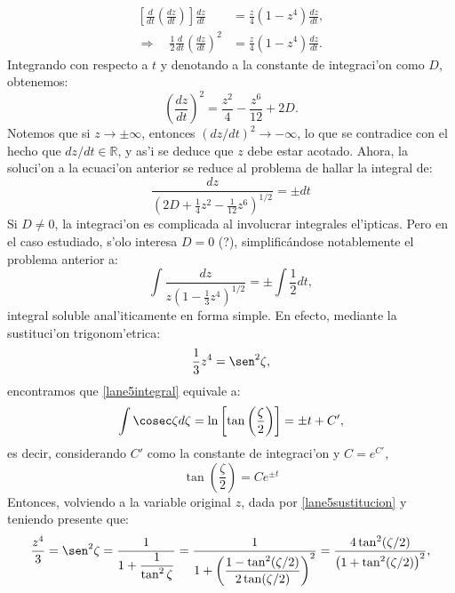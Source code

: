 \begin{align}
\left[\frac{d}{dt}\left(\frac{dz}{dt}\right)\right]\frac{dz}{dt}&=\frac{z}{4}(1-z^4)\frac{dz}{dt},\\
\Rightarrow\quad \frac{1}{2}\frac{d}{dt}\left(\frac{dz}{dt}\right)^2&=\frac{z}{4}(1-z^4)\frac{dz}{dt}.
\end{align}
Integrando con respecto a $t$ y denotando a la constante de integraci'on como $D$, obtenemos:
\begin{equation}
\left(\frac{dz}{dt}\right)^2=\frac{z^2}{4}-\frac{z^6}{12}+2D.
\end{equation}
Notemos que si $z\to\pm\infty$, entonces $(dz/dt)^2\to-\infty$, lo que se contradice con el hecho que $dz/dt\in \mathbb{R}$, y as'i se deduce que $z$ debe estar acotado. Ahora, la soluci'on a la ecuaci'on anterior se reduce al problema de hallar la integral de:
\begin{equation}
 \frac{dz}{\left(2D+\frac{1}{4}z^2-\frac{1}{12}z^6\right)^{1/2}}=\pm dt
\end{equation}
Si $D\neq0$, la integraci'on es complicada al involucrar integrales el'ipticas. Pero en el caso estudiado, s'olo interesa $D=0$ (?), simplific\'andose notablemente el problema anterior a:
\begin{equation}\label{lane5integral}
 \int\frac{dz}{z\left(1-\frac{1}{3}z^4\right)^{1/2}}=\pm\int\frac{1}{2}dt,
\end{equation}
integral soluble anal'iticamente en forma simple. En efecto, mediante la sustituci'on trigonom'etrica:
\begin{equation}\label{lane5sustitucion}
\frac{1}{3}z^4=\sen^2 \zeta,
\end{equation}
encontramos que \eqref{lane5integral} equivale a:
\begin{equation}
\int\cosec\zeta d\zeta =\ln\left[\tan\left(\frac{\zeta}{2}\right)\right]=\pm t+C',
\end{equation}
es decir, considerando $C'$ como la constante de integraci'on y $C=e^{C'}$,
\begin{equation}
 \tan\left(\frac{\zeta}{2}\right)=C e^{\pm t}
\end{equation}
Entonces, volviendo a la variable original $z$, dada por \eqref{lane5sustitucion} y teniendo presente que:
\begin{equation}
\frac{z^4}{3}= \sen^2 \zeta=\frac{1}{1+\dfrac{1}
{\tan^2\zeta}}=\frac{1}{1+\left(\dfrac{1-\tan^2(\zeta/2)}
{2\tan(\zeta/2)}\right)^2}=\frac{4\tan^2(\zeta/2)}{\left(1+\tan^2(\zeta/2)\right)^2},
\end{equation}
